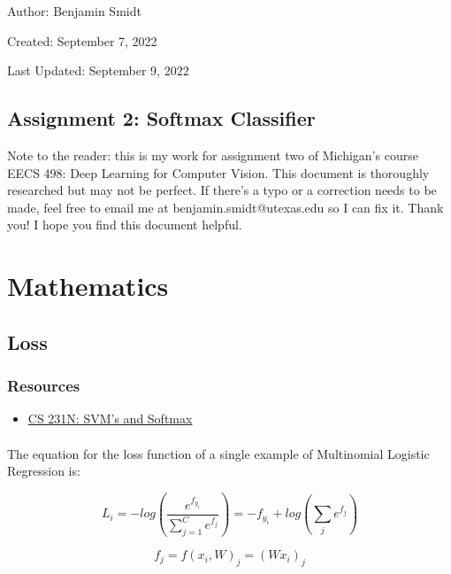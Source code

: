 \documentclass[12pt]{article}
\begin{document}
\noindent Author: Benjamin Smidt

\noindent Created: September 7, 2022

\noindent Last Updated: September 9, 2022
\begin{center}
\section*{Assignment 2: Softmax Classifier}
\end{center}

\noindent Note to the reader: this is my work for assignment two of Michigan's course
EECS 498: Deep Learning for Computer Vision. This document is thoroughly researched but
may not be perfect. If there's a typo or a correction needs to be made, feel free to 
email me at benjamin.smidt@utexas.edu so I can fix it. Thank you! I hope you find this 
document helpful.
\paragraph{}

\section{Mathematics}
\subsection{Loss}
\subsubsection*{Resources}

\begin{itemize}
    \item \href{https://cs231n.github.io/linear-classify/#svm-vs-softmax}{CS 231N: SVM's and Softmax }
\end{itemize}

\paragraph{}
The equation for the loss function of a single example of 
Multinomial Logistic Regression is:  

\begin{equation}
    L_{i} = -log(\frac{e^{f_{y_{i}}}}{\sum_{j=1}^C e^{f_j}}) 
    = -f_{y_{i}} + log(\sum_{j} e^{f_{j}})
\end{equation}

\begin{equation}
    f_j = f(x_{i}, W)_j = (Wx_{i})_j
\end{equation}
\end{document}
